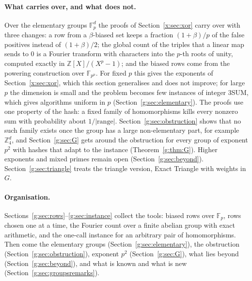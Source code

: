 \documentclass[11pt]{article}
\theoremstyle{definition}
\theoremstyle{remark}
\newcommand{\Z}{\mathbb{Z}}
\newcommand{\Fp}{\mathbb{F}_p}
\begin{document}
\paragraph{What carries over, and what does not.} Over the elementary groups $\Fp^d$ the proofs of Section~\ref{x:sec:xor} carry over with three changes: a row from a $\beta$-biased set keeps a fraction $(1+\beta)/p$ of the false positives instead of $(1+\beta)/2$; the global count of the triples that a linear map sends to $0$ is a Fourier transform with characters into the $p$-th roots of unity, computed exactly in $\Z[X]/(X^p-1)$; and the biased rows come from the powering construction over $\mathbb F_{p^\mu}$. For fixed $p$ this gives the exponents of Section~\ref{x:sec:xor}, which this section generalises and does not improve; for large $p$ the dimension is small and the problem becomes few instances of integer 3SUM, which gives algorithms uniform in $p$ (Section~\ref{g:sec:elementary}). The proofs use one property of the hash: a fixed family of homomorphisms kills every nonzero sum with probability about $1/|\text{range}|$. Section~\ref{g:sec:obstruction} shows that no such family exists once the group has a large non-elementary part, for example $\Z_4^d$, and Section~\ref{g:sec:G} gets around the obstruction for every group of exponent $p^2$ with hashes that adapt to the instance (Theorem~\ref{g:thm:G}). Higher exponents and mixed primes remain open (Section~\ref{g:sec:beyond}). Section~\ref{g:sec:triangle} treats the triangle version, Exact Triangle with weights in $G$.

\paragraph{Organisation.} Sections~\ref{g:sec:rows}--\ref{g:sec:instance} collect the tools: biased rows over $\Fp$, rows chosen one at a time, the Fourier count over a finite abelian group with exact arithmetic, and the one-call instance for an arbitrary pair of homomorphisms. Then come the elementary groups (Section~\ref{g:sec:elementary}), the obstruction (Section~\ref{g:sec:obstruction}), exponent $p^2$ (Section~\ref{g:sec:G}), what lies beyond (Section~\ref{g:sec:beyond}), and what is known and what is new (Section~\ref{g:sec:groupsremarks}).
\end{document}
